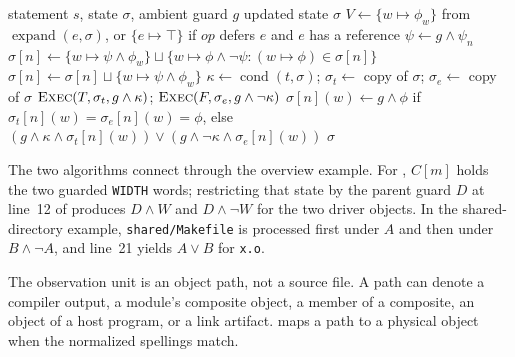 \documentclass[acmsmall,screen,review]{acmart}
\begin{document}
\begin{algorithm}[t]
\caption{\textsc{Exec}: execute one statement over guarded words}
\label{alg:exec}
\begin{algorithmic}[1]
\Require statement $s$, state $\sigma$, ambient guard $g$
\Ensure updated state $\sigma$
  \State $V\gets\{w\mapsto\phi_w\}$ from $\operatorname{expand}(e,\sigma)$, or $\{e\mapsto\top\}$ if $\mathit{op}$ defers $e$ and $e$ has a reference
    \State $\psi\gets g\land\psi_n$
      \State $\sigma[n]\gets\{w\mapsto\psi\land\phi_w\}\sqcup\{w\mapsto\phi\land\neg\psi:(w\mapsto\phi)\in\sigma[n]\}$
    \Else
      \State $\sigma[n]\gets\sigma[n]\sqcup\{w\mapsto\psi\land\phi_w\}$
    \EndIf
  \EndFor
{}
  \State $\kappa\gets\operatorname{cond}(t,\sigma)$; $\sigma_t\gets$ copy of $\sigma$; $\sigma_e\gets$ copy of $\sigma$
  \State $\textsc{Exec}(T,\sigma_t,g\land\kappa)$; $\textsc{Exec}(F,\sigma_e,g\land\neg\kappa)$
    \State $\sigma[n](w)\gets g\land\phi$ if $\sigma_t[n](w)=\sigma_e[n](w)=\phi$, else $(g\land\kappa\land\sigma_t[n](w))\lor(g\land\neg\kappa\land\sigma_e[n](w))$
  \EndFor
\EndIf
\State \Return $\sigma$
\end{algorithmic}
\end{algorithm}

The two algorithms connect through the overview example. For , $C[m]$ holds the two guarded \texttt{WIDTH} words; restricting that state by the parent guard $D$ at line~12 of  produces $D\land W$ and $D\land\neg W$ for the two driver objects. In the shared-directory example, \texttt{shared/Makefile} is processed first under $A$ and then under $B\land\neg A$, and line~21 yields $A\lor B$ for \texttt{x.o}.

The observation unit is an object path, not a source file. A path can denote a compiler output, a module's composite object, a member of a composite, an object of a host program, or a link artifact.  maps a path to a physical object when the normalized spellings match.
\end{document}
